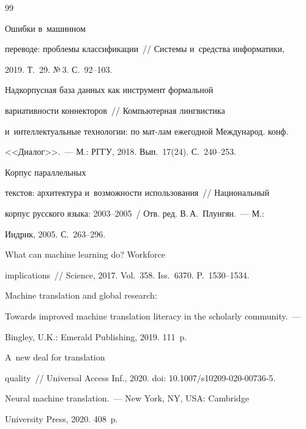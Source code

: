 {{\begin{thebibliography}{99}


 Ошибки в~машинном 


переводе: проблемы классификации~/\!\!/ Системы и~средства информатики, 


2019. Т.~29. №\,3. С.~92--103.




 Надкорпусная база данных как инструмент формальной 


вариативности коннекторов~/\!\!/ Компьютерная лингвистика 


и~интеллектуальные технологии: по мат-лам ежегодной Международ. конф.  


<<Диалог>>.~--- М.: РГГУ, 2018. Вып.~17(24). С.~240--253.




 Корпус параллельных 


текстов: архитектура и~возможности использования~/\!\!/ Национальный 


корпус русского языка: 2003--2005~/ Отв. ред. В.\,А.~Плунгян.~--- М.: 


Индрик, 2005. С.~263--296.




 What can machine learning do? Workforce 


implications~/\!\!/ Science, 2017. Vol.~358. Iss.~6370. P.~1530--1534.







 Machine translation and global research: 


Towards improved machine translation literacy in the scholarly community.~--- 


Bingley, U.K.: Emerald Publishing, 2019. 111~p.




 A~new deal for translation 


quality~/\!\!/ Universal Access Inf., 2020. doi: 10.1007\!/\!s10209-020-00736-5.




 Neural machine translation.~--- New York, NY, USA: Cambridge 


University Press, 2020. 408~p.





\end{thebibliography}


} }








